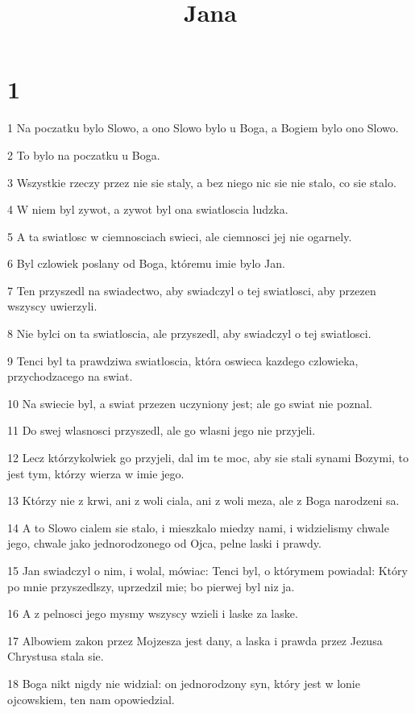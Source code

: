 

\title{Jana}


\chapter{1}

\par 1 Na poczatku bylo Slowo, a ono Slowo bylo u Boga, a Bogiem bylo ono Slowo.
\par 2 To bylo na poczatku u Boga.
\par 3 Wszystkie rzeczy przez nie sie staly, a bez niego nic sie nie stalo, co sie stalo.
\par 4 W niem byl zywot, a zywot byl ona swiatloscia ludzka.
\par 5 A ta swiatlosc w ciemnosciach swieci, ale ciemnosci jej nie ogarnely.
\par 6 Byl czlowiek poslany od Boga, któremu imie bylo Jan.
\par 7 Ten przyszedl na swiadectwo, aby swiadczyl o tej swiatlosci, aby przezen wszyscy uwierzyli.
\par 8 Nie bylci on ta swiatloscia, ale przyszedl, aby swiadczyl o tej swiatlosci.
\par 9 Tenci byl ta prawdziwa swiatloscia, która oswieca kazdego czlowieka, przychodzacego na swiat.
\par 10 Na swiecie byl, a swiat przezen uczyniony jest; ale go swiat nie poznal.
\par 11 Do swej wlasnosci przyszedl, ale go wlasni jego nie przyjeli.
\par 12 Lecz którzykolwiek go przyjeli, dal im te moc, aby sie stali synami Bozymi, to jest tym, którzy wierza w imie jego.
\par 13 Którzy nie z krwi, ani z woli ciala, ani z woli meza, ale z Boga narodzeni sa.
\par 14 A to Slowo cialem sie stalo, i mieszkalo miedzy nami, i widzielismy chwale jego, chwale jako jednorodzonego od Ojca, pelne laski i prawdy.
\par 15 Jan swiadczyl o nim, i wolal, mówiac: Tenci byl, o którymem powiadal: Który po mnie przyszedlszy, uprzedzil mie; bo pierwej byl niz ja.
\par 16 A z pelnosci jego mysmy wszyscy wzieli i laske za laske.
\par 17 Albowiem zakon przez Mojzesza jest dany, a laska i prawda przez Jezusa Chrystusa stala sie.
\par 18 Boga nikt nigdy nie widzial: on jednorodzony syn, który jest w lonie ojcowskiem, ten nam opowiedzial.
